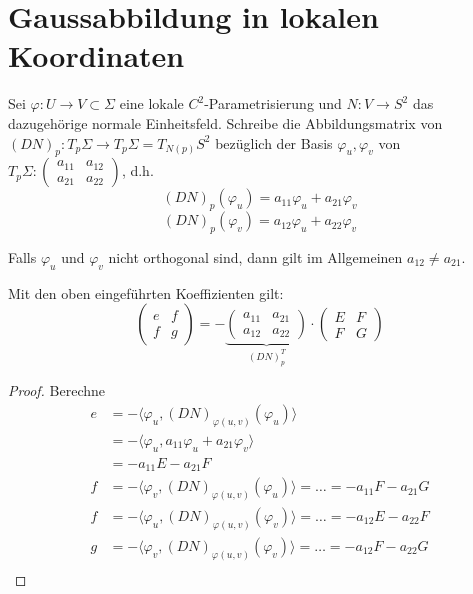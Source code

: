 \documentclass[../main.tex]{subfiles}
\begin{document}
\section{Gaussabbildung in lokalen Koordinaten}
Sei $\varphi:U \rightarrow V \subset \Sigma$ eine lokale $C^{2}$-Parametrisierung und $N:V\rightarrow S^{2}$ das dazugehörige normale Einheitsfeld. Schreibe die Abbildungsmatrix von $(DN)_{p}:T_{p}\Sigma\rightarrow T_{p}\Sigma = T_{N(p)}S^{2}$ bezüglich der Basis ${\varphi_{u}, \varphi_{v}}$ von $T_{p}\Sigma: \begin{pmatrix}
    a_{11} & a_{12}\\ a_{21} & a_{22}
\end{pmatrix}$, d.h. $$(DN)_{p}(\varphi_{u}) = a_{11}\varphi_{u} + a_{21}\varphi_{v}$$ $$(DN)_{p}(\varphi_{v}) = a_{12}\varphi_{u} + a_{22}\varphi_{v}$$
\begin{remark}
    Falls $\varphi_{u}$ und $\varphi_{v}$ nicht orthogonal sind, dann gilt im Allgemeinen $a_{12} \neq a_{21}$.
\end{remark}
\begin{lemma}
    Mit den oben eingeführten Koeffizienten gilt: 
    $$\begin{pmatrix}
        e & f \\ f & g
    \end{pmatrix}  = -\underbrace{\begin{pmatrix}
        a_{11} & a_{21} \\ a_{12} & a_{22}
    \end{pmatrix}}_{(DN)_{p}^{T}}\cdot \begin{pmatrix}
        E & F\\ F & G
    \end{pmatrix}$$
\end{lemma}
\begin{proof}
    Berechne
    \begin{align*}
        e &= -\langle\varphi_{u}, (DN)_{\varphi(u,v)}(\varphi_{u})\rangle\\
        &= -\langle\varphi_{u}, a_{11}\varphi_{u} + a_{21}\varphi_{v}\rangle\\
        &= -a_{11} E - a_{21} F\\
        f &= -\langle\varphi_{v}, (DN)_{\varphi(u,v)}(\varphi_{u})\rangle = \dots = -a_{11} F -a_{21} G\\
        f &= -\langle\varphi_{u}, (DN)_{\varphi(u,v)}(\varphi_{v})\rangle = \dots = -a_{12} E -a_{22} F\\
        g &= -\langle\varphi_{v}, (DN)_{\varphi(u,v)}(\varphi_{v})\rangle = \dots = -a_{12} F -a_{22} G\\
    \end{align*}
\end{proof}
\end{document}
